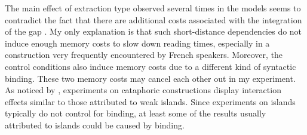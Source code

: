 The main effect of extraction type observed several times in the models seems to contradict the fact that there are additional costs associated with the integration of the gap \citep{Momma.2019}. My only explanation is that such short-distance dependencies do not induce enough memory costs to slow down reading times, especially in a construction very frequently encountered by French speakers. Moreover, the control conditions also induce memory costs due to a different kind of syntactic binding. These two memory costs may cancel each other out in my experiment. As noticed by \citet{Keshev.2019}, experiments on cataphoric constructions display interaction effects similar to those attributed to weak islands. Since experiments on islands typically do not control for binding, at least some of the results usually attributed to islands could be caused by binding.
